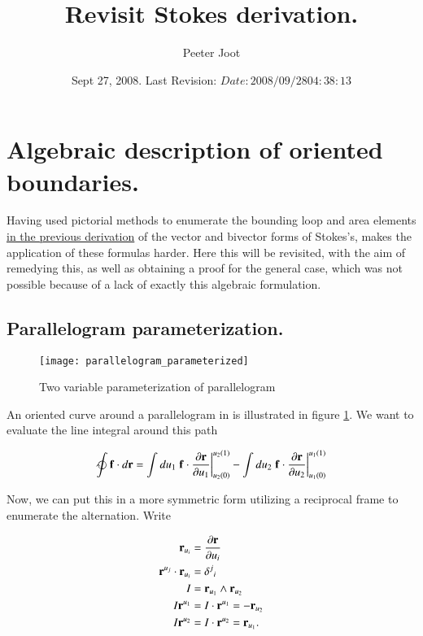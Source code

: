 \documentclass{article}
\title{ Revisit Stokes derivation. }
\author{Peeter Joot}
\date{ Sept 27, 2008.  Last Revision: $Date: 2008/09/28 04:38:13 $ }
\newcommand{\PD}[2]{\frac{\partial {#2}}{\partial {#1}}}
\begin{document}
\maketitle{}

\tableofcontents

\section{ Algebraic description of oriented boundaries. }

Having used pictorial methods to enumerate the bounding loop and area elements 
\href{http://www.geocities.com/peeter_joot/geometric_algebra/vector_integral_relations.pdf}{
in the previous derivation} of the vector and bivector forms of Stokes's, makes the application
of these formulas harder.  Here this will be revisited, with the aim of remedying this, as well as
obtaining a proof for the general case, which was not possible because of a lack of exactly this
algebraic formulation.

\subsection{ Parallelogram parameterization. }

\begin{figure}[htp]
\centering
\texttt{[image: parallelogram\_parameterized]}
\caption{Two variable parameterization of  parallelogram}\label{fig:parallelogram}
\end{figure}

An oriented curve around a parallelogram in  is illustrated in figure 
\ref{fig:parallelogram}.  We want to evaluate the line integral around this
path

\begin{align}\label{eqn:lineprep}
\ointclockwise \Bf \cdot d\Br
&=
\int du_1 \left.{\Bf \cdot \PD{u_1}{\Br} }\right\vert_{u_2(0)}^{u_2(1)}
-\int du_2 \left.{\Bf \cdot \PD{u_2}{\Br} }\right\vert_{u_1(0)}^{u_1(1)} \\
\end{align}

Now, we can put this in a more symmetric form utilizing a reciprocal 
frame to enumerate the alternation.  Write

\begin{align*}
\Br_{u_i} &= \PD{u_i}{\Br} \\
\Br^{u_j} \cdot \Br_{u_i} &= {\delta^j}_i \\
I &= \Br_{u_1} \wedge \Br_{u_2} \\
I \Br^{u_1} &=
I \cdot \Br^{u_1} =
- \Br_{u_2} \\
I \Br^{u_2} &=
I \cdot \Br^{u_2} =
 \Br_{u_1}.
\end{align*}
\end{document}
